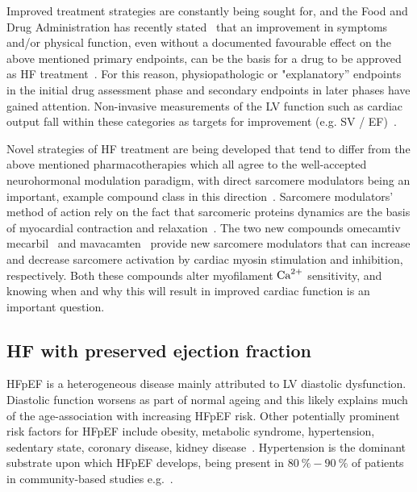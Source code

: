 \vspace{0.2cm}
Improved treatment strategies are constantly being sought for, and the Food and Drug Administration has recently stated~\cite{FDA:2019} that an improvement in symptoms and/or physical function, even without a documented favourable effect on the above mentioned primary endpoints, can be the basis for a drug to be approved as HF treatment~\cite{Fiuzat:2020}. For this reason, physiopathologic or "explanatory'' endpoints in the initial drug assessment phase and secondary endpoints in later phases have gained attention. Non-invasive measurements of the LV function such as cardiac output fall within these categories as targets for improvement (e.g. SV / EF)~\cite{Zanolla:2003}.

\vspace{0.2cm}
Novel strategies of HF treatment are being developed that tend to differ from the above mentioned pharmacotherapies which all agree to the well-accepted neurohormonal modulation paradigm, with direct sarcomere modulators being an important, example compound class in this direction~\cite{Tsukamoto:2020}. Sarcomere modulators' method of action rely on the fact that sarcomeric proteins dynamics are the basis of myocardial contraction and relaxation~\cite{Solaro:1998}. The two new compounds omecamtiv mecarbil~\cite{Teerlink:2016} and mavacamten~\cite{Olivotto:2020} provide new sarcomere modulators that can increase and decrease sarcomere activation by cardiac myosin stimulation and inhibition, respectively. Both these compounds alter myofilament $\textrm{Ca}^{2+}$ sensitivity, and knowing when and why this will result in improved cardiac function is an important question.


%
%
%
\subsection{HF with preserved ejection fraction}\label{sec:ch1HF_with_preserved_ejection_fraction}
HFpEF is a heterogeneous disease mainly attributed to LV diastolic dysfunction. Diastolic function worsens as part of normal ageing \cite{Andersen:2014} and this likely explains much of the age-association with increasing HFpEF risk. Other potentially prominent risk factors for HFpEF include obesity, metabolic syndrome, hypertension, sedentary state, coronary disease, kidney disease~\cite{Pfeffer:2019}. Hypertension is the dominant substrate upon which HFpEF develops, being present in $\SI{80}{\percent}-\SI{90}{\percent}$ of patients in community-based studies e.g.~\cite{Borlaug:2009}.


